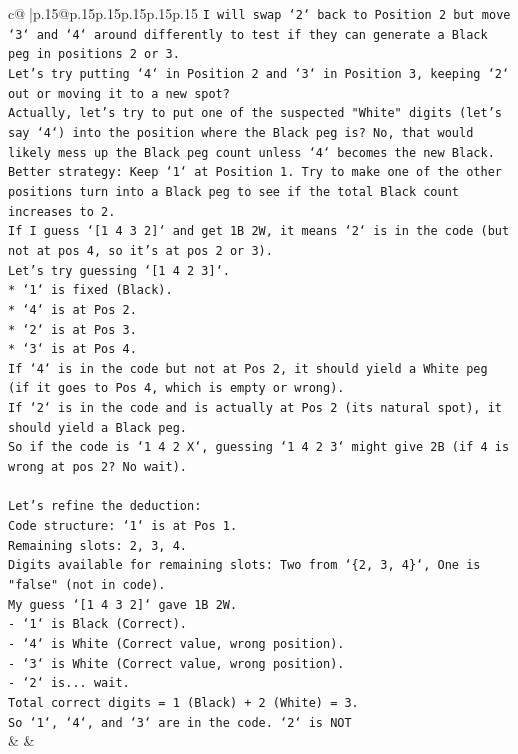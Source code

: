 \documentclass{article}
\begin{document}
{\begin{supertabular}{c@{$\;$}|p{.15\linewidth}@{}p{.15\linewidth}p{.15\linewidth}p{.15\linewidth}p{.15\linewidth}p{.15\linewidth}}
{{{\texttt{I will swap `2` back to Position 2 but move `3` and `4` around differently to test if they can generate a Black peg in positions 2 or 3.} \\
\texttt{Let's try putting `4` in Position 2 and `3` in Position 3, keeping `2` out or moving it to a new spot?} \\
\texttt{Actually, let's try to put one of the suspected "White" digits (let's say `4`) into the position where the Black peg is? No, that would likely mess up the Black peg count unless `4` becomes the new Black.} \\
\texttt{Better strategy: Keep `1` at Position 1. Try to make one of the other positions turn into a Black peg to see if the total Black count increases to 2.} \\
\texttt{If I guess `{[}1 4 3 2{]}` and get 1B 2W, it means `2` is in the code (but not at pos 4, so it's at pos 2 or 3).} \\
\texttt{Let's try guessing `{[}1 4 2 3{]}`.} \\
\texttt{*   `1` is fixed (Black).} \\
\texttt{*   `4` is at Pos 2.} \\
\texttt{*   `2` is at Pos 3.} \\
\texttt{*   `3` is at Pos 4.} \\
\texttt{If `4` is in the code but not at Pos 2, it should yield a White peg (if it goes to Pos 4, which is empty or wrong).} \\
\texttt{If `2` is in the code and is actually at Pos 2 (its natural spot), it should yield a Black peg.} \\
\texttt{So if the code is `1 4 2 X`, guessing `1 4 2 3` might give 2B (if 4 is wrong at pos 2? No wait).} \\
\\ 
\texttt{Let's refine the deduction:} \\
\texttt{Code structure: `1` is at Pos 1.} \\
\texttt{Remaining slots: 2, 3, 4.} \\
\texttt{Digits available for remaining slots: Two from `\{2, 3, 4\}`, One is "false" (not in code).} \\
\texttt{My guess `{[}1 4 3 2{]}` gave 1B 2W.} \\
\texttt{{-} `1` is Black (Correct).} \\
\texttt{{-} `4` is White (Correct value, wrong position).} \\
\texttt{{-} `3` is White (Correct value, wrong position).} \\
\texttt{{-} `2` is... wait.} \\
\texttt{Total correct digits = 1 (Black) + 2 (White) = 3.} \\
\texttt{So `1`, `4`, and `3` are in the code. `2` is NOT} \\
            }
        }
    }
    & & \\ \\


\end{supertabular}}
\end{document}
